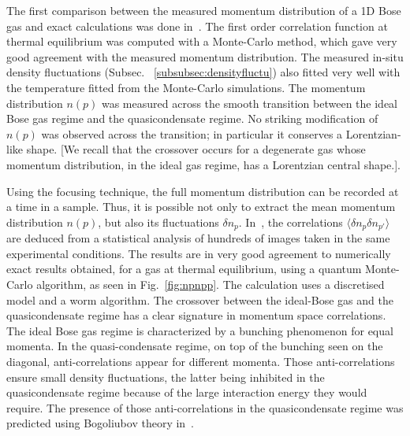 \documentclass[onecolumn,amsfonts,showpacs,superscriptaddress]{revtex4-1}
\begin{document}
The first comparison between the measured momentum distribution of a 1D Bose gas and exact calculations was done in~\citep{jacqmin_momentum_2012}. The first order correlation function at thermal equilibrium was computed with a Monte-Carlo method, which gave very good agreement with the measured momentum distribution. The measured in-situ density fluctuations (Subsec.~ \ref{subsubsec:densityfluctu}) also fitted very well with the temperature 
fitted from the Monte-Carlo simulations.   
The momentum distribution $n(p)$ was measured across the smooth transition between the ideal Bose gas regime and the quasicondensate regime. No striking modification of $n(p)$ was observed across the transition; in particular it conserves a Lorentzian-like shape. [We recall that the crossover occurs for a degenerate gas whose momentum distribution, in the ideal gas regime, has a Lorentzian central shape.].

Using the focusing technique, the full momentum distribution can be recorded at a time in a sample. Thus, it is possible not only to extract the mean momentum distribution $n(p)$, but also its fluctuations $\delta n_p$. In~\citep{fang_momentum-space_2016}, the correlations
$\langle \delta n_p \delta n_{p'}\rangle$ are deduced from a statistical analysis of hundreds of images taken in the same experimental conditions. The results are in very good agreement to numerically exact results obtained, for a gas at thermal equilibrium, using a quantum Monte-Carlo algorithm, as seen in Fig.~\ref{fig:npnpp}.
The calculation uses a discretised model and a worm algorithm.
The crossover between the ideal-Bose gas
and the quasicondensate regime has a clear signature in momentum space correlations. The ideal Bose gas regime is characterized by a bunching phenomenon for equal momenta. In the quasi-condensate regime, on top of the bunching seen on the diagonal, anti-correlations appear for different momenta. Those anti-correlations ensure
small density fluctuations, the latter being inhibited in the quasicondensate regime because of the large interaction energy they would require. The presence of those anti-correlations in the quasicondensate regime was predicted using Bogoliubov theory in~\citep{bouchoule_two-body_2012}.
\end{document}

